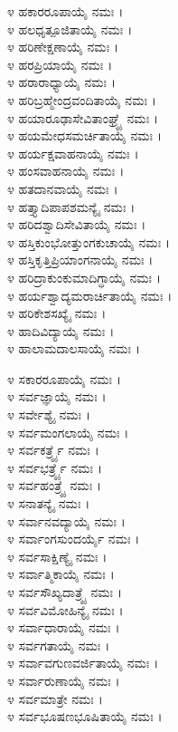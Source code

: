 ೪ ಹಕಾರರೂಪಾಯೈ ನಮಃ ।\\
೪ ಹಲಧೃತ್ಪೂಜಿತಾಯೈ ನಮಃ ।\\
೪ ಹರಿಣೇಕ್ಷಣಾಯೈ ನಮಃ ।\\
೪ ಹರಪ್ರಿಯಾಯೈ ನಮಃ ।\\
೪ ಹರಾರಾಧ್ಯಾಯೈ ನಮಃ ।\\
೪ ಹರಿಬ್ರಹ್ಮೇಂದ್ರವಂದಿತಾಯೈ ನಮಃ ।\\
೪ ಹಯಾರೂಢಾಸೇವಿತಾಂಘ್ರ್ಯೈ ನಮಃ ।\\
೪ ಹಯಮೇಧಸಮರ್ಚಿತಾಯೈ ನಮಃ ।\\
೪ ಹರ್ಯಕ್ಷವಾಹನಾಯೈ ನಮಃ ।\\
೪ ಹಂಸವಾಹನಾಯೈ ನಮಃ ।\\
೪ ಹತದಾನವಾಯೈ ನಮಃ ।\\
೪ ಹತ್ತ್ಯಾದಿಪಾಪಶಮನ್ಯೈ ನಮಃ ।\\
೪ ಹರಿದಶ್ವಾದಿಸೇವಿತಾಯೈ ನಮಃ ।\\
೪ ಹಸ್ತಿಕುಂಭೋತ್ತುಂಗಕುಚಾಯೈ ನಮಃ ।\\
೪ ಹಸ್ತಿಕೃತ್ತಿಪ್ರಿಯಾಂಗನಾಯೈ ನಮಃ ।\\
೪ ಹರಿದ್ರಾಕುಂಕುಮಾದಿಗ್ಧಾಯೈ ನಮಃ ।\\
೪ ಹರ್ಯಶ್ವಾದ್ಯಮರಾರ್ಚಿತಾಯೈ ನಮಃ ।\\
೪ ಹರಿಕೇಶಸಖ್ಯೈ ನಮಃ ।\\
೪ ಹಾದಿವಿದ್ಯಾಯೈ ನಮಃ ।\\
೪ ಹಾಲಾಮದಾಲಸಾಯೈ ನಮಃ ।


೪ ಸಕಾರರೂಪಾಯೈ ನಮಃ ।\\
೪ ಸರ್ವಜ್ಞಾಯೈ ನಮಃ ।\\
೪ ಸರ್ವೇಶ್ಯೈ ನಮಃ ।\\
೪ ಸರ್ವಮಂಗಲಾಯೈ ನಮಃ ।\\
೪ ಸರ್ವಕರ್ತ್ರ್ಯೈ ನಮಃ ।\\
೪ ಸರ್ವಭರ್ತ್ರ್ಯೈ ನಮಃ ।\\
೪ ಸರ್ವಹಂತ್ರ್ಯೈ ನಮಃ ।\\
೪ ಸನಾತನ್ಯೈ ನಮಃ ।\\
೪ ಸರ್ವಾನವದ್ಯಾಯೈ ನಮಃ ।\\
೪ ಸರ್ವಾಂಗಸುಂದರ್ಯೈ ನಮಃ ।\\
೪ ಸರ್ವಸಾಕ್ಷಿಣ್ಯೈ ನಮಃ ।\\
೪ ಸರ್ವಾತ್ಮಿಕಾಯೈ ನಮಃ ।\\
೪ ಸರ್ವಸೌಖ್ಯದಾತ್ರ್ಯೈ ನಮಃ ।\\
೪ ಸರ್ವವಿಮೋಹಿನ್ಯೈ ನಮಃ ।\\
೪ ಸರ್ವಾಧಾರಾಯೈ ನಮಃ ।\\
೪ ಸರ್ವಗತಾಯೈ ನಮಃ ।\\
೪ ಸರ್ವಾವಗುಣವರ್ಜಿತಾಯೈ ನಮಃ ।\\
೪ ಸರ್ವಾರುಣಾಯೈ ನಮಃ ।\\
೪ ಸರ್ವಮಾತ್ರೇ ನಮಃ ।\\
೪ ಸರ್ವಭೂಷಣಭೂಷಿತಾಯೈ ನಮಃ ।

